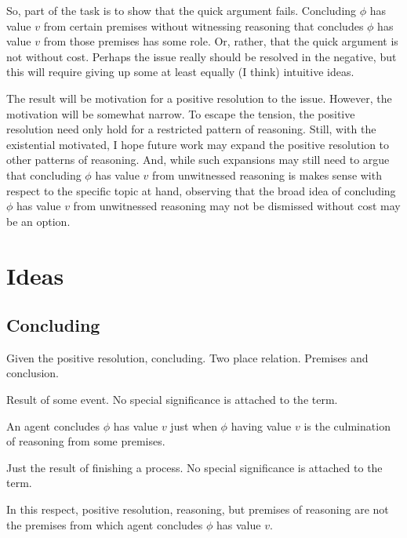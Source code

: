 \begin{note}
  So, part of the task is to show that the quick argument fails.
  Concluding \(\phi\) has value \(v\) from certain premises without witnessing reasoning that concludes \(\phi\) has value \(v\) from those premises has some role.
  Or, rather, that the quick argument is not without cost.
  Perhaps the issue really should be resolved in the negative, but this will require giving up some at least equally (I think) intuitive ideas.

  The result will be motivation for a positive resolution to the issue.
  However, the motivation will be somewhat narrow.
  To escape the tension, the positive resolution need only hold for a restricted pattern of reasoning.
  Still, with the existential motivated, I hope future work may expand the positive resolution to other patterns of reasoning.
  And, while such expansions may still need to argue that concluding \(\phi\) has value \(v\) from unwitnessed reasoning is makes sense with respect to the specific topic at hand, observing that the broad idea of concluding \(\phi\) has value \(v\) from unwitnessed reasoning may not be dismissed without cost may be an option.
\end{note}

\section{Ideas}
\label{sec:ideas-1}

\subsection{Concluding}
\label{sec:outline:concluding}

\begin{note}
  Given the positive resolution, concluding.
  Two place relation.
  Premises and conclusion.

  Result of some event.
  No special significance is attached to the term.

  \begin{assumption}
    An agent concludes \(\phi\) has value \(v\) just when \(\phi\) having value \(v\) is the culmination of reasoning from some premises.
  \end{assumption}

  Just the result of finishing a process.
  No special significance is attached to the term.

  In this respect, positive resolution, reasoning, but premises of reasoning are not the premises from which agent concludes \(\phi\) has value \(v\).
\end{note}

